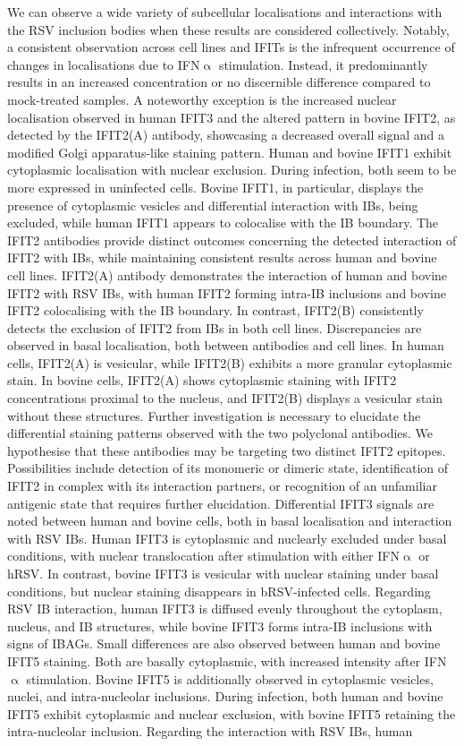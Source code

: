 We can observe a wide variety of subcellular localisations and interactions with the RSV inclusion bodies when these results are considered collectively. Notably, a consistent observation across cell lines and IFITs is the infrequent occurrence of changes in localisations due to IFN$\upalpha$ stimulation. Instead, it predominantly results in an increased concentration or no discernible difference compared to mock-treated samples. A noteworthy exception is the increased nuclear localisation observed in human IFIT3 and the altered pattern in bovine IFIT2, as detected by the IFIT2(A) antibody, showcasing a decreased overall signal and a modified Golgi apparatus-like staining pattern. Human and bovine IFIT1 exhibit cytoplasmic localisation with nuclear exclusion. During infection, both seem to be more expressed in uninfected cells. Bovine IFIT1, in particular, displays the presence of cytoplasmic vesicles and differential interaction with IBs, being excluded, while human IFIT1 appears to colocalise with the IB boundary. The IFIT2 antibodies provide distinct outcomes concerning the detected interaction of IFIT2 with IBs, while maintaining consistent results across human and bovine cell lines. IFIT2(A) antibody demonstrates the interaction of human and bovine IFIT2 with RSV IBs, with human IFIT2 forming intra-IB inclusions and bovine IFIT2 colocalising with the IB boundary. In contrast, IFIT2(B) consistently detects the exclusion of IFIT2 from IBs in both cell lines. Discrepancies are observed in basal localisation, both between antibodies and cell lines. In human cells, IFIT2(A) is vesicular, while IFIT2(B) exhibits a more granular cytoplasmic stain. In bovine cells, IFIT2(A) shows cytoplasmic staining with IFIT2 concentrations proximal to the nucleus, and IFIT2(B) displays a vesicular stain without these structures. Further investigation is necessary to elucidate the differential staining patterns observed with the two polyclonal antibodies. We hypothesise that these antibodies may be targeting two distinct IFIT2 epitopes. Possibilities include detection of its monomeric or dimeric state, identification of IFIT2 in complex with its interaction partners, or recognition of an unfamiliar antigenic state that requires further elucidation. Differential IFIT3 signals are noted between human and bovine cells, both in basal localisation and interaction with RSV IBs. Human IFIT3 is cytoplasmic and nuclearly excluded under basal conditions, with nuclear translocation after stimulation with either IFN$\upalpha$ or hRSV. In contrast, bovine IFIT3 is vesicular with nuclear staining under basal conditions, but nuclear staining disappears in bRSV-infected cells. Regarding RSV IB interaction, human IFIT3 is diffused evenly throughout the cytoplasm, nucleus, and IB structures, while bovine IFIT3 forms intra-IB inclusions with signs of IBAGs. Small differences are also observed between human and bovine IFIT5 staining. Both are basally cytoplasmic, with increased intensity after IFN$\upalpha$ stimulation. Bovine IFIT5 is additionally observed in cytoplasmic vesicles, nuclei, and intra-nucleolar inclusions. During infection, both human and bovine IFIT5 exhibit cytoplasmic and nuclear exclusion, with bovine IFIT5 retaining the intra-nucleolar inclusion. Regarding the interaction with RSV IBs, human 